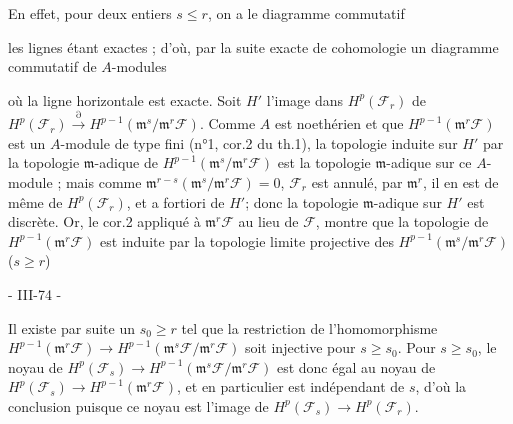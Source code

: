 En effet, pour deux entiers $s \le r$, on a le diagramme commutatif
les lignes étant exactes ; d'où, par la suite exacte de cohomologie un diagramme commutatif de $A$-modules
où la ligne horizontale est exacte. Soit $H'$ l'image dans $H^p(\mathcal{F}_r)$ de $H^p(\mathcal{F}_r) \xrightarrow{\partial} H^{p-1}(\mathfrak{m}^s / \mathfrak{m}^r \mathcal{F})$. Comme $A$ est noethérien et que $H^{p-1}(\mathfrak{m}^r \mathcal{F})$ est un $A$-module de type fini (n°1, cor.2 du th.1), la topologie induite sur $H'$ par la topologie $\mathfrak{m}$-adique de $H^{p-1}(\mathfrak{m}^s / \mathfrak{m}^r \mathcal{F})$ est la topologie $\mathfrak{m}$-adique sur ce $A$-module ; mais comme $\mathfrak{m}^{r-s} (\mathfrak{m}^s / \mathfrak{m}^r \mathcal{F}) = 0$, $\mathcal{F}_r$ est annulé, par $\mathfrak{m}^r$, il en est de même de $H^p(\mathcal{F}_r)$, et a fortiori de $H'$; donc la topologie $\mathfrak{m}$-adique sur $H'$ est discrète. Or, le cor.2 appliqué à $\mathfrak{m}^r \mathcal{F}$ au lieu de $\mathcal{F}$, montre que la topologie de $H^{p-1}(\mathfrak{m}^r \mathcal{F})$ est induite par la topologie limite projective des $H^{p-1}(\mathfrak{m}^s / \mathfrak{m}^r \mathcal{F})$ ($s \ge r$)

\newpage


- III-74 -

Il existe par suite un $s_0 \ge r$ tel que la restriction de l'homomorphisme $H^{p-1}(\mathfrak{m}^r\mathcal{F}) \to H^{p-1}(\mathfrak{m}^s\mathcal{F}/\mathfrak{m}^r\mathcal{F})$ soit injective pour $s \ge s_0$. Pour $s \ge s_0$, le noyau de $H^p(\mathcal{F}_s) \to H^{p-1}(\mathfrak{m}^s\mathcal{F}/\mathfrak{m}^r\mathcal{F})$ est donc égal au noyau de $H^p(\mathcal{F}_s) \to H^{p-1}(\mathfrak{m}^r\mathcal{F})$, et en particulier est indépendant de $s$, d'où la conclusion puisque ce noyau est l'image de $H^p(\mathcal{F}_s) \to H^p(\mathcal{F}_r)$.

